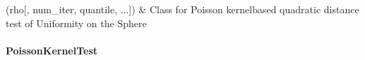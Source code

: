 \documentclass[letterpaper,10pt,english,openany,oneside]{sphinxmanual}
\begin{document}
\begin{savenotes}\sphinxattablestart
\sphinxthistablewithglobalstyle
\sphinxthistablewithnovlinesstyle
\centering
\begin{tabulary}{\linewidth}[t]{}
\sphinxtoprule
\sphinxtableatstartofbodyhook
\sphinxAtStartPar
{\hyperref[\detokenize{api_reference/generated/QuadratiK.poisson_kernel_test.PoissonKernelTest:QuadratiK.poisson_kernel_test.PoissonKernelTest}]{}}(rho{[}, num\_iter, quantile, ...{]})
&
\sphinxAtStartPar
Class for Poisson kernel\sphinxhyphen{}based quadratic distance  test of Uniformity on the Sphere
\\
\sphinxbottomrule
\end{tabulary}
\sphinxtableafterendhook\par
\sphinxattableend\end{savenotes}

\sphinxstepscope


\paragraph{PoissonKernelTest}
\label{\detokenize{api_reference/generated/QuadratiK.poisson_kernel_test.PoissonKernelTest:poissonkerneltest}}\label{\detokenize{api_reference/generated/QuadratiK.poisson_kernel_test.PoissonKernelTest::doc}}
\end{document}
